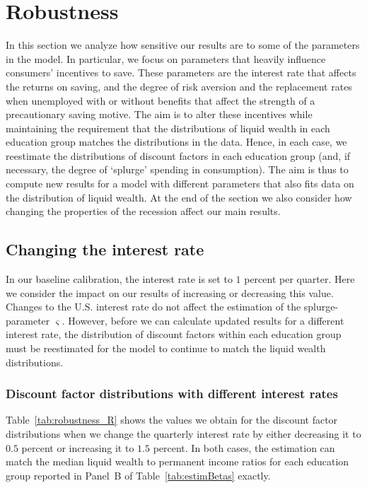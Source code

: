 \documentclass[../HAFiscal]{subfiles}
\begin{document}
\FloatBarrier
\section{Robustness}
\label{sec:robustness}

In this section we analyze how sensitive our results are to some of the parameters in the model. In particular, we focus on parameters that heavily influence consumers' incentives to save. These parameters are the interest rate that affects the returns on saving, and the degree of risk aversion and the replacement rates when unemployed with or without benefits that affect the strength of a precautionary saving motive. The aim is to alter these incentives while maintaining the requirement that the distributions of liquid wealth in each education group matches the distributions in the data. Hence, in each case, we reestimate the distributions of discount factors in each education group (and, if necessary, the degree of `splurge' spending in consumption). The aim is thus to compute new results for a model with different parameters that also fits data on the distribution of liquid wealth. At the end of the section we also consider how changing the properties of the recession affect our main results. 

\subsection{Changing the interest rate}
\label{sec:robust_R} 
In our baseline calibration, the interest rate is set to $1$ percent per quarter. Here we consider the impact on our results of increasing or decreasing this value. Changes to the U.S. interest rate do not affect the estimation of the splurge-parameter $\varsigma$. However, before we can calculate updated results for a different interest rate, the distribution of discount factors within each education group must be reestimated for the model to continue to match the liquid wealth distributions. 

\subsubsection{Discount factor distributions with different interest rates}
\label{sec:robust_R_estim}

Table~\ref{tab:robustness_R} shows the values we obtain for the discount factor distributions when we change the quarterly interest rate by either decreasing it to $0.5$ percent or increasing it to $1.5$ percent. In both cases, the estimation can match the median liquid wealth to permanent income ratios for each education group reported in Panel~B of Table~\ref{tab:estimBetas} exactly. 
\end{document}
